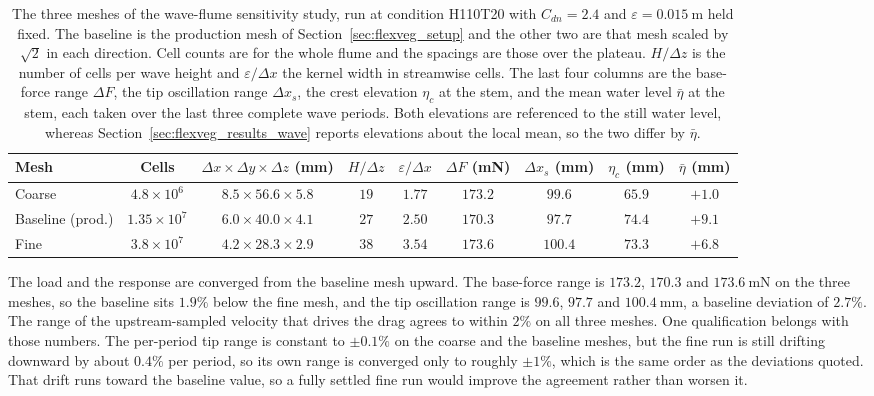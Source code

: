 \begin{appendices}
\begin{table}[!ht]
\centering
\small
\caption{The three meshes of the wave-flume sensitivity study, run at condition H110T20 with $C_{dn} = 2.4$ and $\varepsilon = 0.015~\mathrm{m}$ held fixed. The baseline is the production mesh of Section~\ref{sec:flexveg_setup} and the other two are that mesh scaled by $\sqrt{2}$ in each direction. Cell counts are for the whole flume and the spacings are those over the plateau. $H/\Delta z$ is the number of cells per wave height and $\varepsilon/\Delta x$ the kernel width in streamwise cells. The last four columns are the base-force range $\Delta F$, the tip oscillation range $\Delta x_s$, the crest elevation $\eta_c$ at the stem, and the mean water level $\bar{\eta}$ at the stem, each taken over the last three complete wave periods. Both elevations are referenced to the still water level, whereas Section~\ref{sec:flexveg_results_wave} reports elevations about the local mean, so the two differ by $\bar{\eta}$.}
\label{tab:flexveg_mesh}
\footnotesize
\setlength{\tabcolsep}{2.5pt}
\renewcommand{\arraystretch}{1.15}
\begin{tabular}{l c c c c c c c c}
\toprule
Mesh & Cells & $\Delta x \times \Delta y \times \Delta z$ (mm) & $H/\Delta z$ & $\varepsilon/\Delta x$ & $\Delta F$ (mN) & $\Delta x_s$ (mm) & $\eta_c$ (mm) & $\bar{\eta}$ (mm) \\
\midrule
Coarse   & $4.8\times10^{6}$  & $8.5 \times 56.6 \times 5.8$ & $19$ & $1.77$ & $173.2$ & $99.6$  & $65.9$ & $+1.0$ \\
Baseline (prod.) & $1.35\times10^{7}$ & $6.0 \times 40.0 \times 4.1$ & $27$ & $2.50$ & $170.3$ & $97.7$  & $74.4$ & $+9.1$ \\
Fine     & $3.8\times10^{7}$  & $4.2 \times 28.3 \times 2.9$ & $38$ & $3.54$ & $173.6$ & $100.4$ & $73.3$ & $+6.8$ \\
\bottomrule
\end{tabular}
\end{table}

\noindent
The load and the response are converged from the baseline mesh upward. The base-force range is $173.2$, $170.3$ and $173.6~\mathrm{mN}$ on the three meshes, so the baseline sits $1.9\%$ below the fine mesh, and the tip oscillation range is $99.6$, $97.7$ and $100.4~\mathrm{mm}$, a baseline deviation of $2.7\%$. The range of the upstream-sampled velocity that drives the drag agrees to within $2\%$ on all three meshes. One qualification belongs with those numbers. The per-period tip range is constant to $\pm0.1\%$ on the coarse and the baseline meshes, but the fine run is still drifting downward by about $0.4\%$ per period, so its own range is converged only to roughly $\pm1\%$, which is the same order as the deviations quoted. That drift runs toward the baseline value, so a fully settled fine run would improve the agreement rather than worsen it.


\end{appendices}
